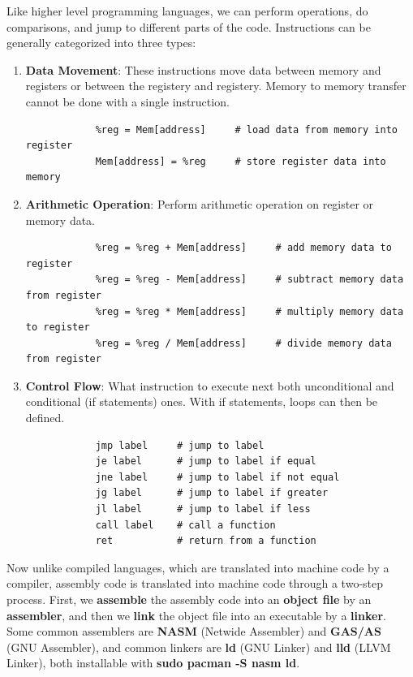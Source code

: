       Like higher level programming languages, we can perform operations, do comparisons, and jump to different parts of the code. Instructions can be generally categorized into three types: 
      \begin{enumerate} 
        \item \textbf{Data Movement}: These instructions move data between memory and registers or between the registery and registery. Memory to memory transfer cannot be done with a single instruction. 
          \begin{lstlisting} 
            %reg = Mem[address]     # load data from memory into register
            Mem[address] = %reg     # store register data into memory
          \end{lstlisting}
        \item \textbf{Arithmetic Operation}: Perform arithmetic operation on register or memory data. 
          \begin{lstlisting} 
            %reg = %reg + Mem[address]     # add memory data to register
            %reg = %reg - Mem[address]     # subtract memory data from register
            %reg = %reg * Mem[address]     # multiply memory data to register
            %reg = %reg / Mem[address]     # divide memory data from register
          \end{lstlisting}
        \item \textbf{Control Flow}: What instruction to execute next both unconditional and conditional (if statements) ones. With if statements, loops can then be defined. 
          \begin{lstlisting} 
            jmp label     # jump to label
            je label      # jump to label if equal
            jne label     # jump to label if not equal
            jg label      # jump to label if greater
            jl label      # jump to label if less
            call label    # call a function
            ret           # return from a function
          \end{lstlisting}
      \end{enumerate}

      Now unlike compiled languages, which are translated into machine code by a compiler, assembly code is translated into machine code through a two-step process. First, we \textbf{assemble} the assembly code into an \textbf{object file} by an \textbf{assembler}, and then we \textbf{link} the object file into an executable by a \textbf{linker}. Some common assemblers are \textbf{NASM} (Netwide Assembler) and \textbf{GAS/AS} (GNU Assembler), and common linkers are \textbf{ld} (GNU Linker) and \textbf{lld} (LLVM Linker), both installable with \textbf{sudo pacman -S nasm ld}. 

